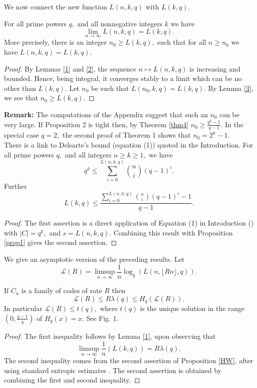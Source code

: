\documentclass[12pt]{article}
\newcommand{\F}{\mathbb{F}}
\theoremstyle{definition}
\begin{document}
We now connect the new function $L(n,k,q)$ with $L(k,q).$

{\theorem \label{thm4} For all prime powers $q,$ and all nonnegative integers $k$ we have
$$\lim_{n \rightarrow \infty }L(n,k,q)=L(k,q).$$
More precisely, there is an integer $n_0\ge L(k,q),$ such that for all $n\ge n_0$ we have $L(n,k,q)=L(k,q).$
}

\begin{proof}
By Lemmas \ref{1} and \ref{2}, the sequence $n \mapsto L(n,k,q)$ is increasing and bounded. Hence, being integral, it converges stably to a limit which can be no other than $L(k,q).$
Let $n_0$ be such that $L(n_0,k,q)=L(k,q).$ By Lemma \ref{3}, we see that $n_0\ge L(k,q).$
\end{proof}
{\bf Remark:} The computations of the Appendix suggest that such an $n_0$ can be very large. If Proposition 2 is tight then, by Theorem \ref{thm4} $n_0 \ge \frac{q^k-1}{q-1}.$
In the special case $q=2,$ the second proof of Theorem 1 shows that $n_0=2^k-1.$\\


There is a link to Delsarte's bound (equation (1)) quoted in the Introduction.
{\prop \label{HW} For all prime powers $q,$ and all integers $n\ge k\ge 1,$ we have
$$q^k \le \sum_{i=0}^{L(n,k,q)}{n \choose i}(q-1)^i.$$
Further
$$L(k,q)\le \frac{\sum\limits_{i=0}^{L(n,k,q)}{n \choose i}(q-1)^i-1}{q-1}.$$}\vspace{-0.0cm}
\begin{proof}
The first assertion is a direct application of Equation (1) in Introduction (\cite[Th. 4.1]{D}) with $|C|=q^k,$ and $s=L(n,k,q).$ Combining this result with Proposition \ref{prop1} gives the second assertion.
\end{proof}
We give an asymptotic version of the preceding results. Let $${\mathcal L}(R)=\limsup_{n \rightarrow \infty}\frac{1}{n}\log_q(L(n,\lfloor Rn \rfloor,q)).$$

{\theorem If $C_n$ is a family of codes of rate $R$ then
$${\mathcal L}(R)\le R \lambda(q) \le H_q({\mathcal L}(R)).  $$
In particular ${\mathcal L}(R)\le t(q),$ where $t(q)$ is the unique solution in the range $(0,\frac{q-1}{q})$ of $H_q(x)=x.$ See Fig. 1.
}
\begin{proof} The first inequality follows by Lemma \ref{1}, upon observing that $$ \limsup_{n \rightarrow \infty}\frac{1}{n}(L(k,q))=R\lambda(q).$$
The second inequality comes from the second assertion of Proposition \ref{HW}, after using standard entropic estimates \cite{HP}.
The second assertion is obtained by combining the first and second inequality.
\end{proof}
\end{document}
